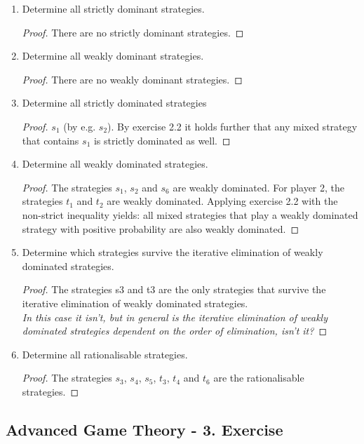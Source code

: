 \documentclass[12pt]{extreport} %
\theoremstyle{named}
\theoremstyle{itshape}
\theoremstyle{normal}
\begin{document}
\begin{enumerate}
	\item Determine all strictly dominant strategies.
		\begin{proof}
			There are no strictly dominant strategies.
		\end{proof}
	\item Determine all weakly dominant strategies.
		\begin{proof}
		There are no weakly dominant strategies.
		\end{proof}
	\item Determine all strictly dominated strategies
		\begin{proof}
			$s_1$ (by e.g. $s_2$). By exercise 2.2 it holds further that any mixed strategy that contains $s_1$ is strictly dominated as well.
		\end{proof}
	\item Determine all weakly dominated strategies.
		\begin{proof}
			The strategies $s_1$, $s_2$ and $s_6$ are weakly dominated. For player 2, the strategies $t_1$ and $t_2$ are weakly dominated. Applying exercise 2.2 with the non-strict inequality yields: all mixed strategies that play a weakly dominated strategy with positive probability are also weakly dominated.
		\end{proof}
	\item Determine which strategies survive the iterative elimination of weakly dominated strategies.
		\begin{proof}
			The strategies s3 and t3 are the only strategies that survive the iterative elimination of weakly dominated strategies. ~\\
			
			\textit{In this case it isn't, but in general is the iterative elimination of weakly dominated strategies dependent on the order of elimination, isn't it?}
		\end{proof}
	 \item Determine all rationalisable strategies.
	 	\begin{proof}
	 		The strategies $s_3$, $s_4$, $s_5$, $t_3$, $t_4$ and $t_6$ are the rationalisable strategies.
	 	\end{proof}
\end{enumerate}

\subsection*{Advanced Game Theory - 3. Exercise}
\end{document}
